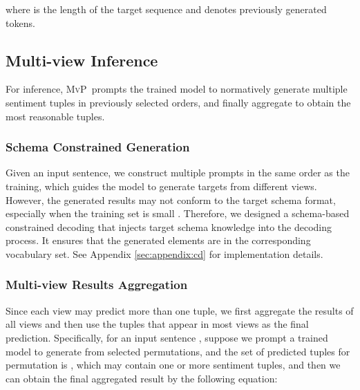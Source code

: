 \documentclass[11pt]{article}
\newcommand\mvp{\textsc{MvP}}
\begin{document}
where  is the length of the target sequence  and  denotes previously generated tokens.





\subsection{Multi-view Inference}
\label{subsec:method:mvp}

For inference, \mvp~prompts the trained model to normatively generate multiple sentiment tuples in previously selected orders, and finally aggregate to obtain the most reasonable tuples. 

\subsubsection{Schema Constrained Generation} 
\label{subsubsec:method:constrained-decoding}
Given an input sentence, we construct multiple prompts in the same order as the training, which guides the model to generate targets from different views. 
However, the generated results may not conform to the target schema format, especially when the training set is small \cite{zhang-etal-2021-aspect, yan-etal-2021-unified}. Therefore, we designed a schema-based constrained decoding \cite{DBLP:conf/iclr/CaoI0P21} that injects target schema knowledge into the decoding process. It ensures that the generated elements are in the corresponding vocabulary set. See Appendix \ref{sec:appendix:cd} for implementation details.

\subsubsection{Multi-view Results Aggregation}
\label{subsubsec:method:aggregation}
Since each view may predict more than one tuple, we first aggregate the results of all views and then use the tuples that appear in most views as the final prediction.
Specifically, for an input sentence , suppose we prompt a trained model to generate from  selected permutations, and the set of predicted tuples for permutation  is , which may contain one or more sentiment tuples, and then we can obtain the final aggregated result  by the following equation:






 
\end{document}
